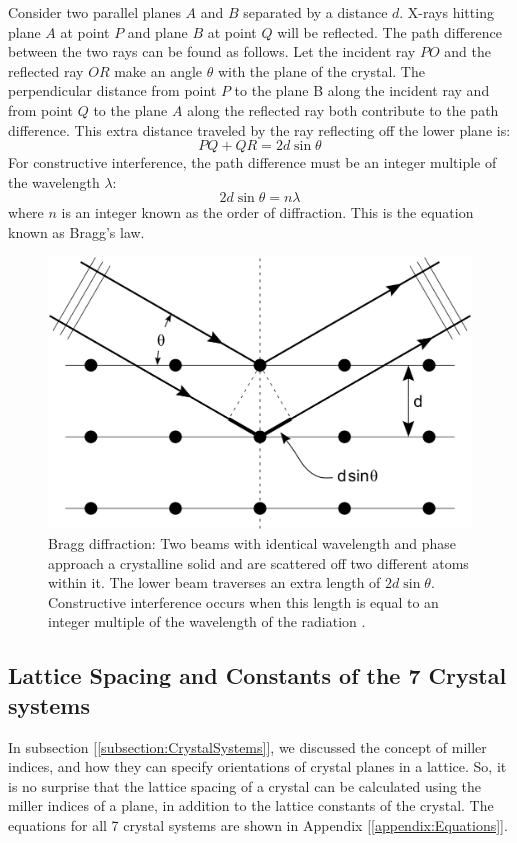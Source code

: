 \documentclass{article}
\begin{document}
Consider two parallel planes $A$ and $B$ separated by a distance $d$. X-rays hitting plane $A$ at point $P$ and plane $B$ at point $Q$ will be reflected. The path difference between the two rays can be found as follows. Let the incident ray $PO$ and the reflected ray $OR$ make an angle $\theta$ with the plane of the crystal. The perpendicular distance from point $P$ to the plane B along the incident ray and from point $Q$ to the plane $A$ along the reflected ray both contribute to the path difference. This extra distance traveled by the ray reflecting off the lower plane is:
\begin{equation}
    PQ+QR = 2d\sin\theta
\end{equation}
For constructive interference, the path difference must be an integer multiple of the wavelength $\lambda$:
\begin{equation}
	\label{eq:Bragg}
    2d \sin \theta = n \lambda
\end{equation}
where $n$ is an integer known as the order of diffraction. This is the equation known as Bragg's law.


\begin{figure}[h]
    \centering
    \includegraphics[width=0.5\linewidth]{Figures/Bragg_diffraction_2.svg.png}
    \caption{Bragg diffraction: Two beams with identical wavelength and phase approach a crystalline solid and are scattered off two different atoms within it. The lower beam traverses an extra length of $2d\sin\theta$. Constructive interference occurs when this length is equal to an integer multiple of the wavelength of the radiation \cite{wikipediacontributors_2019_braggs}.}
    \label{fig:enter-label}
\end{figure}

\pagebreak{}

\subsection{Lattice Spacing and Constants of the 7 Crystal systems}

In subsection [\ref{subsection:CrystalSystems}], we discussed the concept of miller indices, and how they can specify orientations of
crystal planes in a lattice. So, it is no surprise that the lattice spacing of a crystal can be calculated using the miller indices of a plane, in addition to the lattice constants of the crystal. The equations for all 7 crystal systems are
shown in Appendix [\ref{appendix:Equations}].
\end{document}

